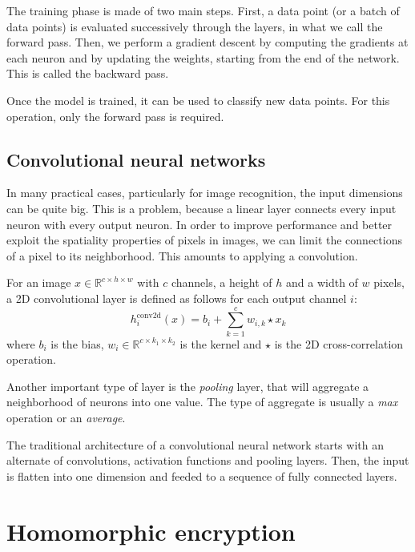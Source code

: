 \documentclass[a4paper,11pt,oneside]{report}
\begin{document}
The training phase is made of two main steps. First, a data point (or a batch of data points) is evaluated successively through the layers, in what we call the forward pass. Then, we perform a gradient descent by computing the gradients at each neuron and by updating the weights, starting from the end of the network. This is called the backward pass.

Once the model is trained, it can be used to classify new data points. For this operation, only the forward pass is required.

\subsection{Convolutional neural networks}

In many practical cases, particularly for image recognition, the input dimensions can be quite big. This is a problem, because a linear layer connects every input neuron with every output neuron. In order to improve performance and better exploit the spatiality properties of pixels in images, we can limit the connections of a pixel to its neighborhood. This amounts to applying a convolution.

For an image $x \in \mathbb{R}^{c \times h \times w}$ with $c$ channels, a height of $h$ and a width of $w$ pixels, a 2D convolutional layer is defined as follows for each output channel $i$:
\begin{equation}\label{conv2d_layer}
    h_i^{\mathrm{conv2d}}(x) = b_i + \sum_{k=1}^{c} w_{i, k} \star x_{k}
\end{equation}
where $b_i$ is the bias, $w_i \in \mathbb{R}^{c \times k_1 \times k_2}$ is the kernel and $\star$ is the 2D cross-correlation operation.

Another important type of layer is the \emph{pooling} layer, that will aggregate a neighborhood of neurons into one value. The type of aggregate is usually a \emph{max} operation or an \emph{average}.

The traditional architecture of a convolutional neural network starts with an alternate of convolutions, activation functions and pooling layers. Then, the input is flatten into one dimension and feeded to a sequence of fully connected layers.


\section{Homomorphic encryption}
\end{document}
